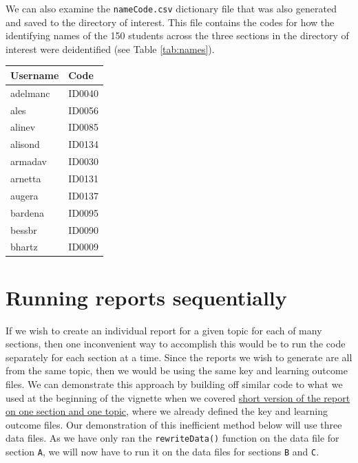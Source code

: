 \documentclass[11pt,a4paper,oldfontcommands,openany]{memoir}
\numberwithin{equation}{section} %
\begin{document}
We can also examine the \texttt{nameCode.csv} dictionary file that was also generated and saved to the directory of interest. This file contains the codes for how the identifying names of the 150 students across the three sections in the directory of interest were deidentified (see Table \ref{tab:names}).

\begin{center}
\label{tab:names}
\begin{tabular} { | l | l |}
\hline \textbf{Username} & \textbf{Code} \\
\hline
adelmanc & ID0040 \\
\hline
ales & ID0056 \\
\hline
alinev & ID0085 \\
\hline
alisond & ID0134 \\
\hline
armadav & ID0030 \\
\hline
arnetta & ID0131 \\
\hline
augera & ID0137 \\
\hline
bardena & ID0095 \\
\hline
bessbr & ID0090 \\
\hline
bhartz & ID0009 \\
\hline
\end{tabular}
\end{center}

\chapter{Running reports sequentially}
\label{sec:sequential}

If we wish to create an individual report for a given topic for each of many sections, then one inconvenient way to accomplish this would be to run the code separately for each section at a time. Since the reports we wish to generate are all from the same topic, then we would be using the same key and learning outcome files. We can demonstrate this approach by building off similar code to what we used at the beginning of the vignette when we covered \hyperref[sec:codeOnce]{short version of the report on one section and one topic}, where we already defined the key and learning outcome files. Our demonstration of this inefficient method below will use three data files. As we have only ran the \texttt{rewriteData()} function on the data file for section \texttt{A}, we will now have to run it on the data files for sections \texttt{B} and \texttt{C}. \\
\end{document}
